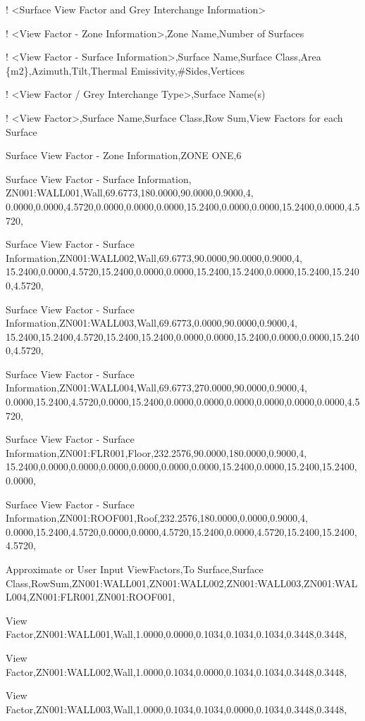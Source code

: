 ! \textless{}Surface View Factor and Grey Interchange Information\textgreater{}

! \textless{}View Factor - Zone Information\textgreater{},Zone Name,Number of Surfaces

! \textless{}View Factor - Surface Information\textgreater{},Surface Name,Surface Class,Area \{m2\},Azimuth,Tilt,Thermal Emissivity,\#Sides,Vertices

! \textless{}View Factor / Grey Interchange Type\textgreater{},Surface Name(s)

! \textless{}View Factor\textgreater{},Surface Name,Surface Class,Row Sum,View Factors for each Surface

Surface View Factor - Zone Information,ZONE ONE,6

Surface View Factor - Surface Information, ZN001:WALL001,Wall,69.6773,180.0000,90.0000,0.9000,4, 0.0000,0.0000,4.5720,0.0000,0.0000,0.0000,15.2400,0.0000,0.0000,15.2400,0.0000,4.5720,

Surface View Factor - Surface Information,ZN001:WALL002,Wall,69.6773,90.0000,90.0000,0.9000,4, 15.2400,0.0000,4.5720,15.2400,0.0000,0.0000,15.2400,15.2400,0.0000,15.2400,15.2400,4.5720,

Surface View Factor - Surface Information,ZN001:WALL003,Wall,69.6773,0.0000,90.0000,0.9000,4, 15.2400,15.2400,4.5720,15.2400,15.2400,0.0000,0.0000,15.2400,0.0000,0.0000,15.2400,4.5720,

Surface View Factor - Surface Information,ZN001:WALL004,Wall,69.6773,270.0000,90.0000,0.9000,4, 0.0000,15.2400,4.5720,0.0000,15.2400,0.0000,0.0000,0.0000,0.0000,0.0000,0.0000,4.5720,

Surface View Factor - Surface Information,ZN001:FLR001,Floor,232.2576,90.0000,180.0000,0.9000,4, 15.2400,0.0000,0.0000,0.0000,0.0000,0.0000,0.0000,15.2400,0.0000,15.2400,15.2400,0.0000,

Surface View Factor - Surface Information,ZN001:ROOF001,Roof,232.2576,180.0000,0.0000,0.9000,4, 0.0000,15.2400,4.5720,0.0000,0.0000,4.5720,15.2400,0.0000,4.5720,15.2400,15.2400,4.5720,

Approximate or User Input ViewFactors,To Surface,Surface Class,RowSum,ZN001:WALL001,ZN001:WALL002,ZN001:WALL003,ZN001:WALL004,ZN001:FLR001,ZN001:ROOF001,

View Factor,ZN001:WALL001,Wall,1.0000,0.0000,0.1034,0.1034,0.1034,0.3448,0.3448,

View Factor,ZN001:WALL002,Wall,1.0000,0.1034,0.0000,0.1034,0.1034,0.3448,0.3448,

View Factor,ZN001:WALL003,Wall,1.0000,0.1034,0.1034,0.0000,0.1034,0.3448,0.3448,

